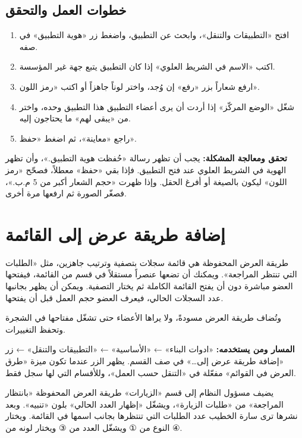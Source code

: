 \subsection{خطوات العمل والتحقق}
\begin{enumerate}
\item افتح «التطبيقات والتنقل»، وابحث عن التطبيق، واضغط زر «هوية التطبيق» في صفه.
\item اكتب «الاسم في الشريط العلوي» إذا كان التطبيق يتبع جهة غير المؤسسة.
\item ارفع شعاراً بزر «رفع» إن وُجد، واختر لوناً جاهزاً أو اكتب «رمز اللون».
\item شغّل «الوضع المركّز» إذا أردت أن يرى أعضاء التطبيق هذا التطبيق وحده، واختر من «يبقى لهم» ما يحتاجون إليه.
\item راجع «معاينة»، ثم اضغط «حفظ».
\end{enumerate}

\textbf{تحقق ومعالجة المشكلة:} يجب أن تظهر رسالة «حُفظت هوية التطبيق.»، وأن تظهر الهوية في الشريط العلوي عند فتح التطبيق. فإذا بقي «حفظ» معطلاً، فصحّح «رمز اللون» ليكون بالصيغة  أو أفرغ الحقل. وإذا ظهرت «حجم الشعار أكبر من 5 م.ب.»، فصغّر الصورة ثم ارفعها مرة أخرى.

\clearpage
\section{إضافة طريقة عرض إلى القائمة}
\label{sec:builder-feature-navigation-views}

طريقة العرض المحفوظة هي قائمة سجلات بتصفية وترتيب جاهزين، مثل «الطلبات التي تنتظر المراجعة». ويمكنك أن تضعها عنصراً مستقلاً في قسم من القائمة، فيفتحها العضو مباشرة دون أن يفتح القائمة الكاملة ثم يختار التصفية. ويمكن أن يظهر بجانبها عدد السجلات الحالي، فيعرف العضو حجم العمل قبل أن يفتحها.

وتُضاف طريقة العرض مسودةً، ولا يراها الأعضاء حتى تشغّل مفتاحها في الشجرة وتحفظ التغييرات.

\textbf{المسار ومن يستخدمه:} «ادوات البناء» ← «الأساسية» ← «التطبيقات والتنقل» ← زر «إضافة طريقة عرض إلى…» في صف القسم. يظهر الزر عندما تكون ميزة «طرق العرض في القوائم» مفعّلة في «التنقل حسب العمل»، وللأقسام التي لها سجل فقط.

\begin{rcnote}
يضيف مسؤول النظام إلى قسم «الزيارات» طريقة العرض المحفوظة «بانتظار المراجعة» من «طلبات الزيارة»، ويشغّل «إظهار العدد الحالي» بلون «تنبيه». وبعد نشرها ترى سارة الخطيب عدد الطلبات التي تنتظرها بجانب اسمها في القائمة. ويختار النوع من ① ويشغّل العدد من ③ ويختار لونه من ④.
\end{rcnote}

